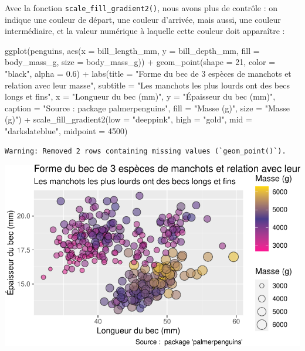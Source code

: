 \documentclass[
  a4paper,
  DIV=11,
  numbers=noendperiod,
  oneside]{scrreprt}
\newenvironment{Shaded}{}{}
\newcommand{\AttributeTok}[1]{\textcolor[rgb]{0.84,0.23,0.29}{#1}}
\newcommand{\DecValTok}[1]{\textcolor[rgb]{0.00,0.36,0.77}{#1}}
\newcommand{\FloatTok}[1]{\textcolor[rgb]{0.00,0.36,0.77}{#1}}
\newcommand{\FunctionTok}[1]{\textcolor[rgb]{0.44,0.26,0.76}{#1}}
\newcommand{\NormalTok}[1]{\textcolor[rgb]{0.14,0.16,0.18}{#1}}
\newcommand{\SpecialCharTok}[1]{\textcolor[rgb]{0.00,0.36,0.77}{#1}}
\newcommand{\StringTok}[1]{\textcolor[rgb]{0.01,0.18,0.38}{#1}}
\begin{document}
Avec la fonction \texttt{scale\_fill\_gradient2()}, nous avons plus de
contrôle : on indique une couleur de départ, une couleur d'arrivée, mais
aussi, une couleur intermédiaire, et la valeur numérique à laquelle
cette couleur doit apparaître :

\begin{Shaded}
\begin{Highlighting}[]
\FunctionTok{ggplot}\NormalTok{(penguins, }\FunctionTok{aes}\NormalTok{(}\AttributeTok{x =}\NormalTok{ bill\_length\_mm, }\AttributeTok{y =}\NormalTok{ bill\_depth\_mm,}
                     \AttributeTok{fill =}\NormalTok{ body\_mass\_g, }\AttributeTok{size =}\NormalTok{ body\_mass\_g)) }\SpecialCharTok{+}
  \FunctionTok{geom\_point}\NormalTok{(}\AttributeTok{shape =} \DecValTok{21}\NormalTok{, }\AttributeTok{color =} \StringTok{"black"}\NormalTok{, }\AttributeTok{alpha =} \FloatTok{0.6}\NormalTok{) }\SpecialCharTok{+}
  \FunctionTok{labs}\NormalTok{(}\AttributeTok{title =} \StringTok{"Forme du bec de 3 espèces de manchots et relation avec leur masse"}\NormalTok{,}
       \AttributeTok{subtitle =} \StringTok{"Les manchots les plus lourds ont des becs longs et fins"}\NormalTok{,}
       \AttributeTok{x =} \StringTok{"Longueur du bec (mm)"}\NormalTok{,}
       \AttributeTok{y =} \StringTok{"Épaisseur du bec (mm)"}\NormalTok{,}
       \AttributeTok{caption =} \StringTok{"Source :  package \textquotesingle{}palmerpenguins\textquotesingle{}"}\NormalTok{,}
       \AttributeTok{fill =} \StringTok{"Masse (g)"}\NormalTok{,}
       \AttributeTok{size =} \StringTok{"Masse (g)"}\NormalTok{) }\SpecialCharTok{+}
  \FunctionTok{scale\_fill\_gradient2}\NormalTok{(}\AttributeTok{low =} \StringTok{"deeppink"}\NormalTok{, }\AttributeTok{high =} \StringTok{"gold"}\NormalTok{, }\AttributeTok{mid =} \StringTok{"darkslateblue"}\NormalTok{,}
                       \AttributeTok{midpoint =} \DecValTok{4500}\NormalTok{)}
\end{Highlighting}
\end{Shaded}

\begin{verbatim}
Warning: Removed 2 rows containing missing values (`geom_point()`).
\end{verbatim}

\includegraphics{03-visualization_files/figure-pdf/unnamed-chunk-97-1.pdf}
\end{document}
